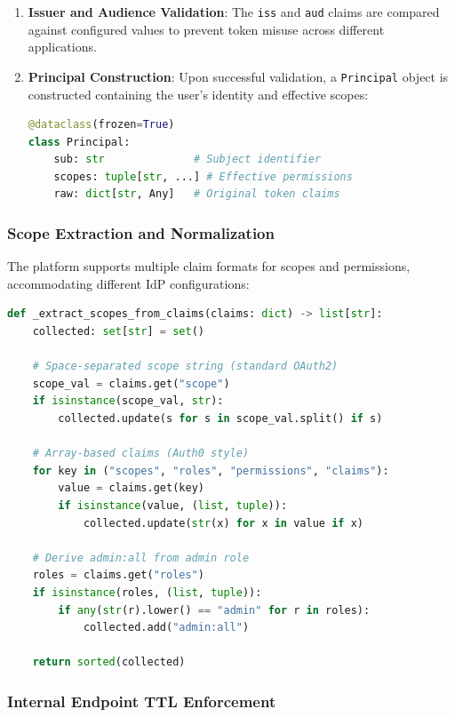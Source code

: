 \begin{enumerate}
    \item \textbf{Issuer and Audience Validation}: The \texttt{iss} and \texttt{aud} claims are compared against configured values to prevent token misuse across different applications.
    
    \item \textbf{Principal Construction}: Upon successful validation, a \texttt{Principal} object is constructed containing the user's identity and effective scopes:
    
\begin{lstlisting}[language=Python,caption={Principal dataclass for authenticated users}]
@dataclass(frozen=True)
class Principal:
    sub: str              # Subject identifier
    scopes: tuple[str, ...] # Effective permissions
    raw: dict[str, Any]   # Original token claims
\end{lstlisting}
\end{enumerate}

\subsubsection{Scope Extraction and Normalization}

The platform supports multiple claim formats for scopes and permissions, accommodating different IdP configurations:

\begin{lstlisting}[language=Python,caption={Multi-format scope extraction}]
def _extract_scopes_from_claims(claims: dict) -> list[str]:
    collected: set[str] = set()
    
    # Space-separated scope string (standard OAuth2)
    scope_val = claims.get("scope")
    if isinstance(scope_val, str):
        collected.update(s for s in scope_val.split() if s)
    
    # Array-based claims (Auth0 style)
    for key in ("scopes", "roles", "permissions", "claims"):
        value = claims.get(key)
        if isinstance(value, (list, tuple)):
            collected.update(str(x) for x in value if x)
    
    # Derive admin:all from admin role
    roles = claims.get("roles")
    if isinstance(roles, (list, tuple)):
        if any(str(r).lower() == "admin" for r in roles):
            collected.add("admin:all")
    
    return sorted(collected)
\end{lstlisting}

\subsubsection{Internal Endpoint TTL Enforcement}

